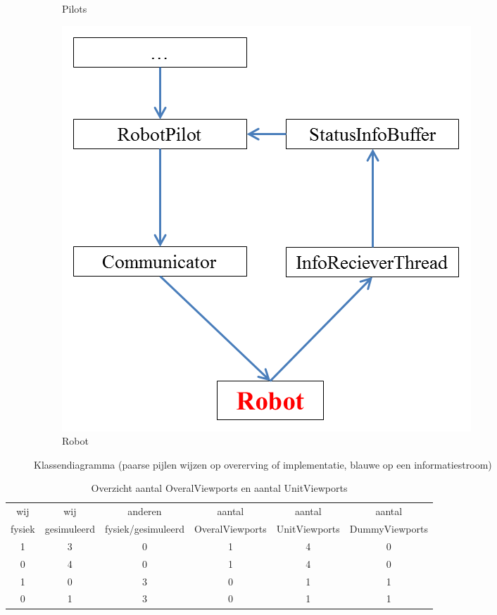 \documentclass[tt1]{penoverslag}
\begin{document}
\begin{landscape}
\begin{figure}
\begin{subfigure}{0.5\textwidth}
	\caption{Pilots}
\end{subfigure}%
\begin{subfigure}{0.45\textwidth}
		\centering
		\includegraphics[width=\textwidth]{KlasRobot}
	\caption{Robot}
\end{subfigure}
\caption[Klassendiagramma]{Klassendiagramma (paarse pijlen wijzen op overerving of implementatie, blauwe op een informatiestroom)}
\label{fig:klasDia}
\end{figure}
\end{landscape}

\begin{table}
\begin{center}
    \begin{tabular}{ c | c | c || c | c | c }
    wij & wij & anderen & aantal & aantal & aantal\\
    fysiek & gesimuleerd & fysiek/gesimuleerd & OveralViewports & UnitViewports & DummyViewports\\ \hline \hline
    1 & 3 & 0 & 1 & 4 & 0\\
    0 & 4 & 0 & 1 & 4 & 0\\
    1 & 0 & 3 & 0 & 1 & 1\\
    0 & 1 & 3 & 0 & 1 & 1\\
    \end{tabular}
    \caption{Overzicht aantal OveralViewports en aantal UnitViewports}
    \label{tab:aantViewPorts}
\end{center}
\end{table}
\end{document}
